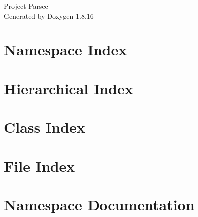 \let\mypdfximage\pdfximage\def\pdfximage{\immediate\mypdfximage}\documentclass[twoside]{book}
\newcommand{\+}{\discretionary{\mbox{\scriptsize$\hookleftarrow$}}{}{}}
\newcommand{\clearemptydoublepage}{%
  \newpage{\pagestyle{empty}\cleardoublepage}%
}
\begin{document}
\hypersetup{pageanchor=false,
             bookmarksnumbered=true,
             pdfencoding=unicode
            }
\begin{titlepage}
\vspace*{7cm}
\begin{center}%
{\Large Project Parsec }\\
\vspace*{1cm}
{\large Generated by Doxygen 1.8.16}\\
\end{center}
\end{titlepage}
\clearemptydoublepage
{}
\tableofcontents
\clearemptydoublepage
{}
\hypersetup{pageanchor=true}

\chapter{Namespace Index}

\chapter{Hierarchical Index}

\chapter{Class Index}

\chapter{File Index}

\chapter{Namespace Documentation}








\end{document}
